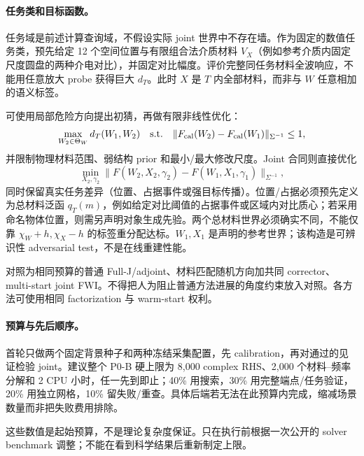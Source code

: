 \paragraph{任务类和目标函数。}
任务域是前述计算查询域，不假设实际 joint 世界中不存在墙。作为固定的数值任务类，预先给定 12 个空间位置与有限组合法介质材料 $V_X$（例如参考介质内固定尺度圆盘的两种介电对比），并固定对比幅度。评价完整同任务材料全波响应，不能用任意放大 probe 获得巨大 $d_T$。此时 $X$ 是 $T$ 内全部材料，而非与 $W$ 任意相加的语义标签。

可使用局部危险方向提出初猜，再做有限非线性优化：
\[
\max_{W_2\in\Theta_W}
d_T(W_1,W_2)
\quad\text{s.t.}\quad
\|F_{\rm cal}(W_2)-F_{\rm cal}(W_1)\|_{\Sigma^{-1}}\le1,
\]
并限制物理材料范围、弱结构 prior 和最小/最大修改尺度。Joint 合同则直接优化
\[
\min_{X_2,\gamma_2}
\|F(W_2,X_2,\gamma_2)-F(W_1,X_1,\gamma_1)\|_{\Sigma^{-1}},
\]
同时保留真实任务差异（位置、占据事件或强目标传播）。位置/占据必须预先定义为总材料泛函 $q_T(m)$，例如给定对比阈值的占据事件或区域内对比质心；若采用命名物体位置，则需另声明对象生成先验。两个总材料世界必须确实不同，不能仅靠 $\chi_W+h,\chi_X-h$ 的标签重分配达标。$W_1,X_1$ 是声明的参考世界；该构造是可辨识性 adversarial test，不是在线重建性能。

对照为相同预算的普通 Full-J/adjoint、材料匹配随机方向加共同 corrector、multi-start joint FWI。不得把人为阻止普通方法进展的角度约束放入对照。各方法可使用相同 factorization 与 warm-start 权利。

\paragraph{预算与先后顺序。}
首轮只做两个固定背景种子和两种冻结采集配置，先 calibration，再对通过的见证检验 joint。建议整个 P0-B 硬上限为 8,000 complex RHS、2,000 个材料--频率分解和 2 CPU 小时，任一先到即止；40\% 用搜索，30\% 用完整端点/任务验证，20\% 用独立网格，10\% 留失败/重查。具体后端若无法在此预算内完成，缩减场景数量而非把失败费用排除。

这些数值是起始预算，不是理论复杂度保证。只在执行前根据一次公开的 solver benchmark 调整；不能在看到科学结果后重新制定上限。

